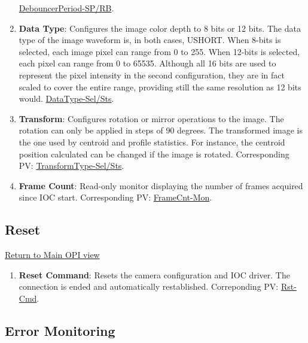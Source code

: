 \documentclass[openany]{article}
\begin{document}
\begin{enumerate}
                        \hyperlink{pv:debouncer-period}{DebouncerPeriod-SP/RB}.
            \item \textbf{Data Type}: Configures the image color depth to 8 bits or
                        12 bits. The data type of the image waveform is, in both cases, 
                        USHORT. When 8-bits is selected, each image pixel can range from 0 
                        to 255. When 12-bits is selected, each pixel can range from 0 to 
                        65535. Although all 16 bits are used to represent the pixel 
                        intensity in the second configuration, they are in fact scaled to 
                        cover the entire range, providing still the same resolution as 12 
                        bits would. \hyperlink{pv:data-type}{DataType-Sel/Sts}.
             \item \textbf{Transform}: Configures rotation or mirror operations to 
                        the image. The rotation can only be applied in steps of 90 degrees.
                        The transformed image is the one used by centroid and profile 
                        statistics. For instance, the centroid position calculated can be 
                        changed if the image is rotated. Corresponding PV: 
                        \hyperlink{pv:transf-type}{TransformType-Sel/Sts}.
            \item \textbf{Frame Count}: Read-only monitor displaying the number of 
                        frames acquired since IOC start. Corresponding PV: 
                        \hyperlink{pv:frame-cnt}{FrameCnt-Mon}.
        \end{enumerate}

    \subsection{Reset}\label{sec:reset}

        \hyperref[fig:opi-main]{Return to Main OPI view}

        \begin{enumerate}
            \item \textbf{Reset Command}: Resets the camera configuration and IOC 
                        driver. The connection is ended and automatically restablished. 
                        Correponding PV: \hyperlink{pv:reset}{Rst-Cmd}.
        \end{enumerate}

    \subsection{Error Monitoring}\label{sec:err-mon}
\end{document}
